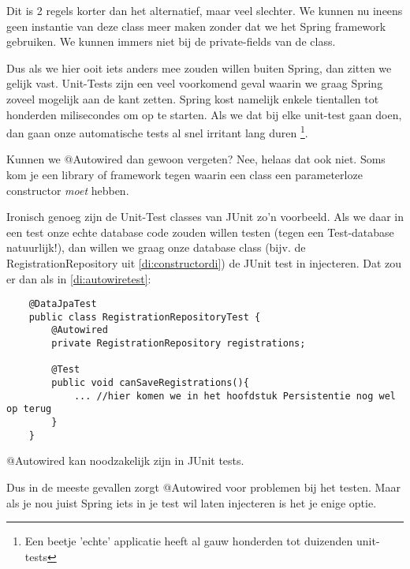 Dit is 2 regels korter dan het alternatief, maar veel slechter. We kunnen nu ineens geen instantie van deze class
meer maken zonder dat we het Spring framework gebruiken. We kunnen immers niet bij de private-fields van de class.

Dus als we hier ooit iets anders mee zouden willen buiten Spring, dan zitten we gelijk vast. Unit-Tests zijn een 
veel voorkomend geval waarin we graag Spring zoveel mogelijk aan de kant zetten. Spring kost namelijk enkele tientallen
tot honderden milisecondes om op te starten. Als we dat bij elke unit-test gaan doen, dan gaan onze automatische
tests al snel irritant lang duren \footnote{Een beetje 'echte' applicatie heeft al gauw honderden tot duizenden unit-tests}.

Kunnen we @Autowired dan gewoon vergeten? Nee, helaas dat ook niet.
Soms kom je een library of framework tegen waarin een class een parameterloze constructor \emph{moet} hebben.

Ironisch genoeg zijn de Unit-Test classes van JUnit zo'n voorbeeld. Als we daar in een test onze echte database code
zouden willen testen (tegen een Test-database natuurlijk!), dan willen we graag onze database class (bijv. de RegistrationRepository
uit \ref{di:constructordi}) de JUnit test in injecteren. Dat zou er dan als in \ref{di:autowiretest}:

\begin{listing}[H]
    \begin{verbatim}
    @DataJpaTest
    public class RegistrationRepositoryTest {
        @Autowired
        private RegistrationRepository registrations;

        @Test
        public void canSaveRegistrations(){
            ... //hier komen we in het hoofdstuk Persistentie nog wel op terug
        }
    }
    \end{verbatim}
    \caption{@Autowired kan noodzakelijk zijn in JUnit tests.}
    \label{di:autowiretest}
\end{listing}

Dus in de meeste gevallen zorgt @Autowired voor problemen bij het testen. Maar als je nou juist Spring iets in je test 
wil laten injecteren is het je enige optie. 